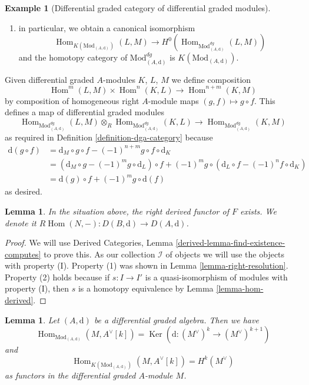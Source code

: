 \documentclass{stacks-project}
\theoremstyle{plain}
\newtheorem{lemma}[subsection]{Lemma}
\theoremstyle{definition}
\newtheorem{example}[subsection]{Example}
\theoremstyle{remark}
\numberwithin{equation}{subsection}
\def\Hom{\mathop{\mathrm{Hom}}\nolimits}
\def\Ker{\mathop{\mathrm{Ker}}}
\begin{document}
\begin{example}[Differential graded category of differential graded modules]
\begin{enumerate}
to zero if and only if $f = \text{d}(g)$ for some
$g \in \Hom^{n - 1}(L, M)$.
\item in particular, we obtain a canonical isomorphism
$$
\Hom_{K(\text{Mod}_{(A, \text{d})})}(L, M)
\longrightarrow
H^0(\Hom_{\text{Mod}^{dg}_{(A, \text{d})}}(L, M))
$$
and the homotopy category of $\text{Mod}^{dg}_{(A, \text{d})}$ is
$K(\text{Mod}_{(A, \text{d})})$.
\end{enumerate}
Given differential graded $A$-modules $K$, $L$, $M$ we define
composition
$$
\Hom^m(L, M) \times \Hom^n(K, L) \longrightarrow \Hom^{n + m}(K, M)
$$
by composition of homogeneous right $A$-module maps $(g, f) \mapsto g \circ f$.
This defines a map of differential graded modules
$$
\Hom_{\text{Mod}^{dg}_{(A, \text{d})}}(L, M) \otimes_R
\Hom_{\text{Mod}^{dg}_{(A, \text{d})}}(K, L) \longrightarrow
\Hom_{\text{Mod}^{dg}_{(A, \text{d})}}(K, M)
$$
as required in
Definition \ref{definition-dga-category}
because
\begin{align*}
\text{d}(g \circ f) & =
\text{d}_M \circ g \circ f - (-1)^{n + m} g \circ f \circ \text{d}_K \\
& =
\left(\text{d}_M \circ g - (-1)^m g \circ \text{d}_L\right) \circ f +
(-1)^m g \circ \left(\text{d}_L \circ f - (-1)^n f \circ \text{d}_K\right) \\
& =
\text{d}(g) \circ f + (-1)^m g \circ \text{d}(f)
\end{align*}
as desired.
\end{example}

\begin{lemma}
\label{lemma-derived-restriction}
In the situation above, the right derived functor of $F$ exists.
We denote it $R\Hom(N, -) : D(B, \text{d}) \to D(A, \text{d})$.
\end{lemma}

\begin{proof}
We will use
Derived Categories, Lemma \ref{derived-lemma-find-existence-computes}
to prove this. As our collection $\mathcal{I}$
of objects we will use the objects with property (I).
Property (1) was shown in Lemma \ref{lemma-right-resolution}.
Property (2) holds because if $s : I \to I'$ is a quasi-isomorphism
of modules with property (I), then $s$ is a homotopy equivalence
by Lemma \ref{lemma-hom-derived}.
\end{proof}

\begin{lemma}
\label{lemma-hom-into-shift-dual-free}
Let $(A, \text{d})$ be a differential graded algebra. Then we have
$$
\Hom_{\text{Mod}_{(A, \text{d})}}(M, A^\vee[k]) =
\Ker(\text{d} : (M^\vee)^k \to (M^\vee)^{k + 1})
$$
and
$$
\Hom_{K(\text{Mod}_{(A, \text{d})})}(M, A^\vee[k]) = H^k(M^\vee)
$$
as functors in the differential graded $A$-module $M$.
\end{lemma}
\end{document}
